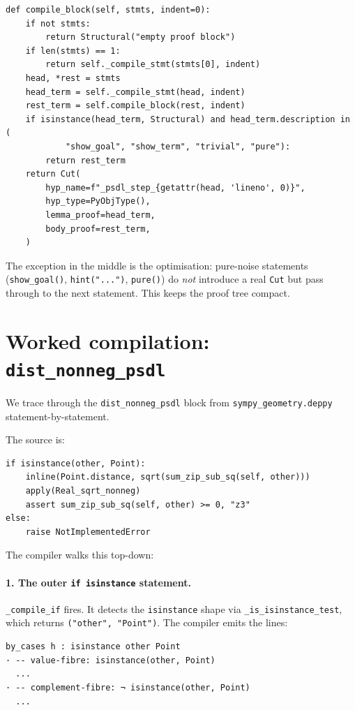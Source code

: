 \begin{lstlisting}[caption={\texttt{compile\_block} (lines 405--431),
the chaining engine.}]
def compile_block(self, stmts, indent=0):
    if not stmts:
        return Structural("empty proof block")
    if len(stmts) == 1:
        return self._compile_stmt(stmts[0], indent)
    head, *rest = stmts
    head_term = self._compile_stmt(head, indent)
    rest_term = self.compile_block(rest, indent)
    if isinstance(head_term, Structural) and head_term.description in (
            "show_goal", "show_term", "trivial", "pure"):
        return rest_term
    return Cut(
        hyp_name=f"_psdl_step_{getattr(head, 'lineno', 0)}",
        hyp_type=PyObjType(),
        lemma_proof=head_term,
        body_proof=rest_term,
    )
\end{lstlisting}

The exception in the middle is the optimisation: pure-noise
statements (\verb|show_goal()|, \verb|hint("...")|, \verb|pure()|)
do \emph{not} introduce a real \texttt{Cut} but pass through to the
next statement.  This keeps the proof tree compact.

\section{Worked compilation: \texttt{dist\_nonneg\_psdl}}
\label{sec:psdl-worked}

We trace through the \texttt{dist\_nonneg\_psdl} block from
\texttt{sympy\_geometry.deppy} statement-by-statement.

The \PSDL{} source is:

\begin{lstlisting}[language=psdl]
if isinstance(other, Point):
    inline(Point.distance, sqrt(sum_zip_sub_sq(self, other)))
    apply(Real_sqrt_nonneg)
    assert sum_zip_sub_sq(self, other) >= 0, "z3"
else:
    raise NotImplementedError
\end{lstlisting}

The compiler walks this top-down:

\paragraph{1. The outer \texttt{if isinstance} statement.}
\texttt{\_compile\_if} fires.  It detects the \texttt{isinstance}
shape via \texttt{\_is\_isinstance\_test}, which returns
\texttt{("other", "Point")}.  The compiler emits the \Lean{} lines:

\begin{lstlisting}[language=lean4]
by_cases h : isinstance other Point
· -- value-fibre: isinstance(other, Point)
  ...
· -- complement-fibre: ¬ isinstance(other, Point)
  ...
\end{lstlisting}

